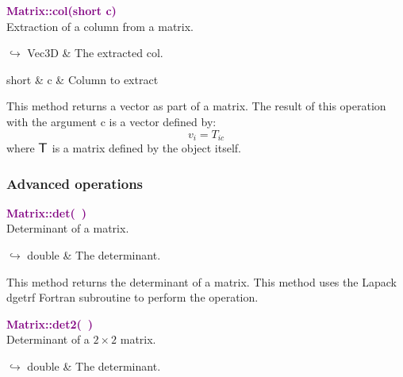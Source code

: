 \textcolor{purple}{\textbf{Matrix::col(short c)}}\label{Matrix::col(short c)}\\
Extraction of a column from a matrix.\vspace*{-0.5em}
\begin{tcolorbox}[grow to left by=-1cm, width=\textwidth-1cm,myArgs,tabularx={l|R}]
$\hookrightarrow$ Vec3D & The extracted col.
\end{tcolorbox}

\begin{tcolorbox}[width=\textwidth,myArgs,tabularx={ll|R}]
short & c & Column to extract
\end{tcolorbox}

This method returns a vector as part of a matrix.
The result of this operation with the argument c is a vector defined by:
\begin{equation*}
v_{i} = T_{ic}
\end{equation*}
where $\mbox{\large\ensuremath{\mathsf{T}}}$ is a matrix defined by the object itself.

\subsubsection{Advanced operations}

\textcolor{purple}{\textbf{Matrix::det(~)}}\label{Matrix::det()}\\
Determinant of a matrix.\vspace*{-0.5em}
\begin{tcolorbox}[grow to left by=-1cm, width=\textwidth-1cm,myArgs,tabularx={l|R}]
$\hookrightarrow$ double & The determinant.
\end{tcolorbox}

This method returns the determinant of a matrix.
This method uses the Lapack \textsf{dgetrf} Fortran subroutine to perform the operation.

\textcolor{purple}{\textbf{Matrix::det2(~)}}\label{Matrix::det2()}\\
Determinant of a $2 \times 2$ matrix.\vspace*{-0.5em}
\begin{tcolorbox}[grow to left by=-1cm, width=\textwidth-1cm,myArgs,tabularx={l|R}]
$\hookrightarrow$ double & The determinant.
\end{tcolorbox}

